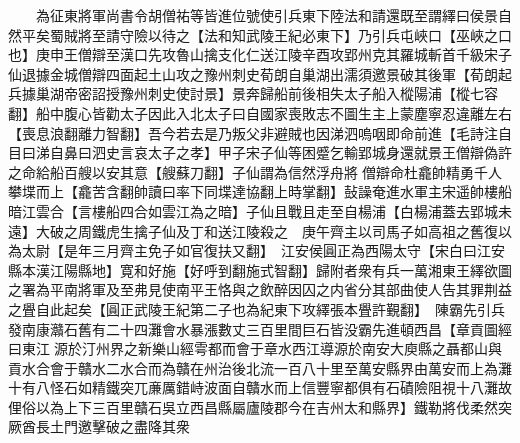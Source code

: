 　　為征東將軍尚書令胡僧祐等皆進位號使引兵東下陸法和請還既至謂繹曰侯景自然平矣蜀賊將至請守險以待之【法和知武陵王紀必東下】乃引兵屯峽口【巫峽之口也】庚申王僧辯至漢口先攻魯山擒支化仁送江陵辛酉攻郢州克其羅城斬首千級宋子仙退據金城僧辯四面起土山攻之豫州刺史荀朗自巢湖出濡須邀景破其後軍【荀朗起兵據巢湖帝密詔授豫州刺史使討景】景奔歸船前後相失太子船入樅陽浦【樅七容翻】船中腹心皆勸太子因此入北太子曰自國家喪敗志不圖生主上蒙塵寧忍違離左右【喪息浪翻離力智翻】吾今若去是乃叛父非避賊也因涕泗嗚咽即命前進【毛詩注自目曰涕自鼻曰泗史言哀太子之孝】甲子宋子仙等困蹙乞輸郢城身還就景王僧辯偽許之命給船百艘以安其意【艘蘇刀翻】子仙謂為信然浮舟將僧辯命杜龕帥精勇千人攀堞而上【龕苦含翻帥讀曰率下同堞達協翻上時掌翻】鼔譟奄進水軍主宋遥帥樓船暗江雲合【言樓船四合如雲江為之暗】子仙且戰且走至自楊浦【白楊浦蓋去郢城未遠】大破之周鐵虎生擒子仙及丁和送江陵殺之　庚午齊主以司馬子如高祖之舊復以為太尉【是年三月齊主免子如官復扶又翻】　江安侯圓正為西陽太守【宋白曰江安縣本漢江陽縣地】寛和好施【好呼到翻施式智翻】歸附者衆有兵一萬湘東王繹欲圖之署為平南將軍及至弗見使南平王恪與之飲醉因囚之内省分其部曲使人告其罪荆益之舋自此起矣【圓正武陵王紀第二子也為紀東下攻繹張本舋許覲翻】　陳霸先引兵發南康灨石舊有二十四灘會水暴漲數丈三百里間巨石皆没霸先進頓西昌【章貢圖經曰東江源於汀州界之新樂山經雩都而會于章水西江導源於南安大庾縣之聶都山與貢水合會于贛水二水合而為贛在州治後北流一百八十里至萬安縣界由萬安而上為灘十有八怪石如精鐵突兀亷厲錯峙波面自贛水而上信豐寧都俱有石磧險阻視十八灘故俚俗以為上下三百里贛石吳立西昌縣屬廬陵郡今在吉州太和縣界】鐵勒將伐柔然突厥酋長土門邀擊破之盡降其衆

